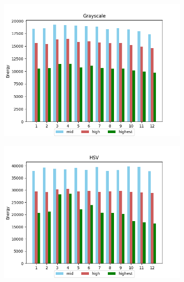 \begin{figure}[H]
    \caption{\label{fig:appendix_card_fft_results}Card FFT approach for (a) Grayscale, (b) HSV and (c) LAB images.}
    \centering
    \begin{subfigure}{.5\textwidth}
        \centering
        \includegraphics[scale=0.41]{images/appendix/fft/card/grayscale.png}
        \caption{}
    \end{subfigure}%
    \begin{subfigure}{.5\textwidth}
         \centering
          \includegraphics[scale=0.41]{images/appendix/fft/card/hsv.png}
          \caption{}
    \end{subfigure}
    \fautor
\end{figure}

